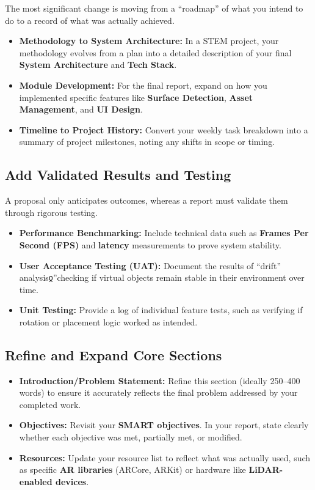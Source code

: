 \documentclass{report}
\begin{document}
The most significant change is moving from a ``roadmap'' of what you intend to
do to a record of what was actually achieved.

\begin{itemize}
  \item \textbf{Methodology to System Architecture:} In a STEM project, your
    methodology evolves from a plan into a detailed description of your final
    \textbf{System Architecture} and \textbf{Tech Stack}.
  \item \textbf{Module Development:} For the final report, expand on how you
    implemented specific features like \textbf{Surface Detection},
    \textbf{Asset Management}, and \textbf{UI Design}.
  \item \textbf{Timeline to Project History:} Convert your weekly task breakdown
    into a summary of project milestones, noting any shifts in scope or timing.
\end{itemize}

\subsection{Add Validated Results and Testing}

A proposal only anticipates outcomes, whereas a report must validate them
through rigorous testing.

\begin{itemize}
  \item \textbf{Performance Benchmarking:} Include technical data such as
    \textbf{Frames Per Second (FPS)} and \textbf{latency} measurements to prove
    system stability.
  \item \textbf{User Acceptance Testing (UAT):} Document the results of
    ``drift'' analysisჲ”checking if virtual objects remain stable in their
    environment over time.
  \item \textbf{Unit Testing:} Provide a log of individual feature tests, such
    as verifying if rotation or placement logic worked as intended.
\end{itemize}

\subsection{Refine and Expand Core Sections}

\begin{itemize}
  \item \textbf{Introduction/Problem Statement:} Refine this section (ideally
    250--400 words) to ensure it accurately reflects the final problem addressed
    by your completed work.
  \item \textbf{Objectives:} Revisit your \textbf{SMART objectives}. In your
    report, state clearly whether each objective was met, partially met, or
    modified.
  \item \textbf{Resources:} Update your resource list to reflect what was
    actually used, such as specific \textbf{AR libraries} (ARCore, ARKit) or
    hardware like \textbf{LiDAR-enabled devices}.
\end{itemize}
\end{document}
